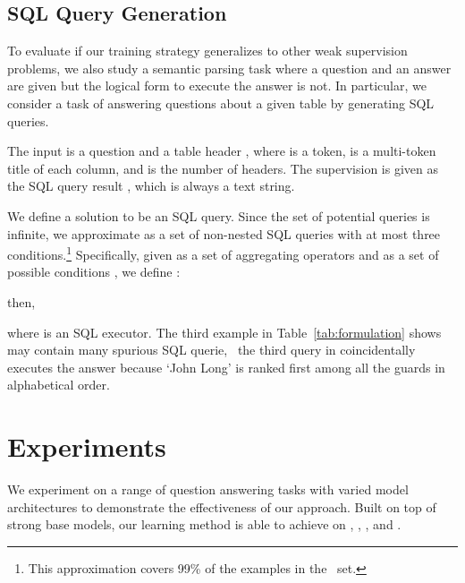 \documentclass[11pt,a4paper]{article}
\begin{document}
\subsection{SQL Query Generation}
To evaluate if our training strategy generalizes to other weak supervision problems, we also study a semantic parsing task where a question and an answer are given but the logical form to execute the answer is not. In particular, we consider a task of answering questions about a given table by generating SQL queries.

The input is a question  and a table header , where  is a token,  is a multi-token title of each column, and  is the number of headers. The supervision is given as the SQL query result , which is always a text string.

We define a solution to be an SQL query.
Since the set of potential queries is infinite, we approximate  as a set of non-nested SQL queries with at most three conditions.\footnote{This approximation covers 99\% of the examples in the \dev\ set.} 
Specifically, given  as a set of aggregating operators  and  as a set of possible conditions , we define :

then,

where  is an SQL executor. The third example in Table~\ref{tab:formulation} shows  may contain many spurious SQL querie, \eg\ the third query in  coincidentally executes the answer because `John Long' is ranked first among all the guards in alphabetical order.







 \section{Experiments}\label{sec:exp}We experiment on a range of question answering tasks with varied model architectures to demonstrate the effectiveness of our approach. Built on top of strong base models, our learning method is able to achieve \sota{} on \narrative, \triviaopen, \nqopen, \drop and \wikisql.
\end{document}
